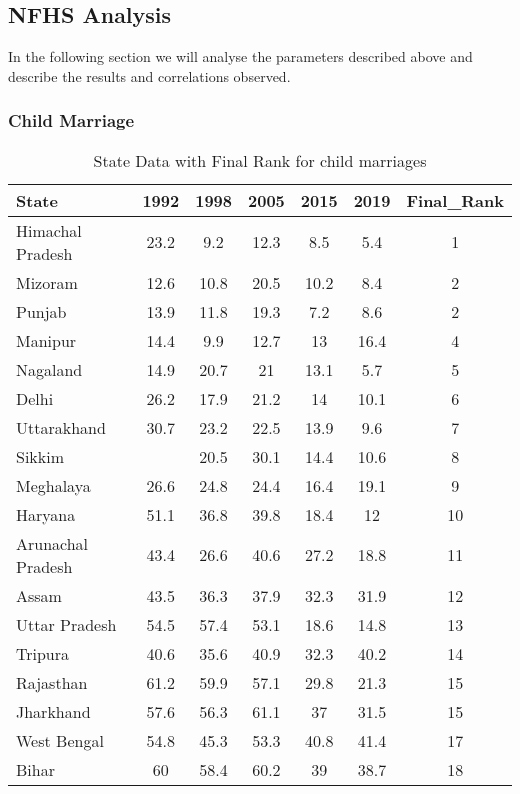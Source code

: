 \subsection{NFHS Analysis}
In the following section we will analyse the parameters described above and describe the results and correlations observed.
\subsubsection{Child Marriage}
\begin{table}[h!]
\centering
\begin{tabular}{lcccccc}
\toprule
State             & 1992 & 1998 & 2005 & 2015 & 2019 & Final\_Rank \\
\midrule
Himachal Pradesh  & 23.2 & 9.2  & 12.3 & 8.5  & 5.4  & 1          \\
Mizoram           & 12.6 & 10.8 & 20.5 & 10.2 & 8.4  & 2          \\
Punjab            & 13.9 & 11.8 & 19.3 & 7.2  & 8.6  & 2          \\
Manipur           & 14.4 & 9.9  & 12.7 & 13   & 16.4 & 4          \\
Nagaland          & 14.9 & 20.7 & 21   & 13.1 & 5.7  & 5          \\
Delhi             & 26.2 & 17.9 & 21.2 & 14   & 10.1 & 6          \\
Uttarakhand       & 30.7 & 23.2 & 22.5 & 13.9 & 9.6  & 7          \\
Sikkim            &      & 20.5 & 30.1 & 14.4 & 10.6 & 8          \\
Meghalaya         & 26.6 & 24.8 & 24.4 & 16.4 & 19.1 & 9          \\
Haryana           & 51.1 & 36.8 & 39.8 & 18.4 & 12   & 10         \\
Arunachal Pradesh & 43.4 & 26.6 & 40.6 & 27.2 & 18.8 & 11         \\
Assam             & 43.5 & 36.3 & 37.9 & 32.3 & 31.9 & 12         \\
Uttar Pradesh     & 54.5 & 57.4 & 53.1 & 18.6 & 14.8 & 13         \\
Tripura           & 40.6 & 35.6 & 40.9 & 32.3 & 40.2 & 14         \\
Rajasthan         & 61.2 & 59.9 & 57.1 & 29.8 & 21.3 & 15         \\
Jharkhand         & 57.6 & 56.3 & 61.1 & 37   & 31.5 & 15         \\
West Bengal       & 54.8 & 45.3 & 53.3 & 40.8 & 41.4 & 17         \\
Bihar             & 60   & 58.4 & 60.2 & 39   & 38.7 & 18         \\
\bottomrule
\end{tabular}
\caption{State Data with Final Rank for child marriages}
\label{tab:child_marriage}
\end{table}

